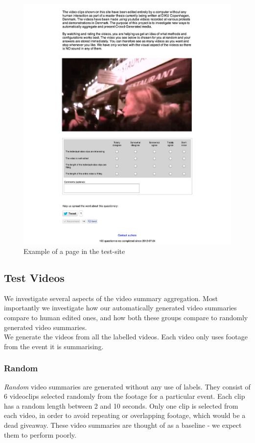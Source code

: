 \begin{figure}
     \centering
     \includegraphics[width=1.0\textwidth]{img/website.png}
     \caption{Example of a page in the test-site}\label{fig:website}
\end{figure}
%
\subsection{Test Videos}
%
We investigate several aspects of the video summary aggregation. Most importantly we investigate how our automatically generated video summaries compare to human edited ones, and how both these groups compare to randomly generated video summaries.\\
We generate the videos from all the labelled videos. Each video only uses footage from the event it is summarising.
%
\subsubsection{Random}
%
\textit{Random} video summaries are generated without any use of labels. They consist of 6 videoclips selected randomly from the footage for a particular event. Each clip has a random length between 2 and 10 seconds. Only one clip is selected from each video, in order to avoid repeating or overlapping footage, which would be a dead giveaway. These video summaries are thought of as a baseline - we expect them to perform poorly.
%
